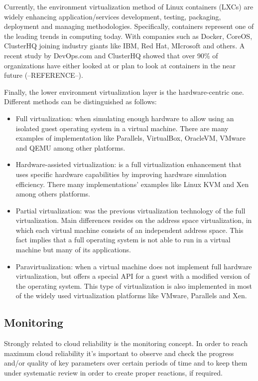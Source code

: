 Currently, the environment virtualization method of Linux containers (LXCs) are widely enhancing application/services development, testing, packaging, deployment and managing methodologies. Specifically, containers represent one of the leading trends in computing today. With companies such as Docker, CoreOS, ClusterHQ joining industry giants like IBM, Red Hat, MIcrosoft and others. A recent study by DevOps.com and ClusterHQ showed that over 90\% of organizations have either looked at or plan to look at containers in the near future (--REFERENCE--).

Finally, the lower environment virtualization layer is the hardware-centric one. Different methods can be distinguished as follows:

\begin{itemize}
\item Full virtualization: when simulating enough hardware to allow using an isolated guest operating system in a virtual machine. There are many examples of implementation like Parallels, VirtualBox, OracleVM, VMware and QEMU among other platforms.
\item Hardware-assisted virtualization: is a full virtualization enhancement that uses specific hardware capabilities by improving hardware simulation efficiency. There many implementations' examples like Linux KVM and Xen among others platforms. 
\item Partial virtualization: was the previous virtualization technology of the full virtualization. Main differences resides on the address space virtualization, in which each virtual machine consists of an independent address space. This fact implies that a full operating system is not able to run in a virtual machine but many of its applications. 
\item Paravirtualization: when a virtual machine does not implement full hardware virtualization, but offers a special API for a guest with a modified version of the operating system. This type of virtualization is also implemented in most of the widely used virtualization platforms like VMware, Parallels and Xen.
\end{itemize}

\subsection{Monitoring}\label{SOA:monitoring}

Strongly related to cloud reliability is the monitoring concept. In order to reach maximum cloud reliability it's important to observe and check the progress and/or quality of key parameters over certain periods of time and to keep them under systematic review in order to create proper reactions, if required.

